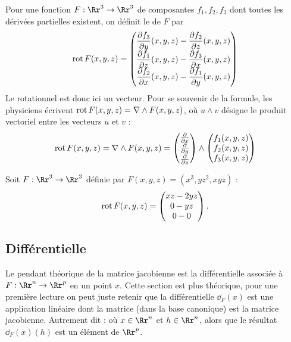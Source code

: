 \documentclass[12pt, class=report,crop=false]{standalone}
\begin{document}
\bigskip
\bigskip


Pour une fonction  $F : \Rr^3 \to \Rr^3$ de composantes $f_1,f_2,f_3$ dont toutes les dérivées partielles existent, on d\'efinit le  de $F$ par
$$\operatorname{rot} F (x,y,z)=
\begin{pmatrix}
    \dfrac{\partial f_3}{\partial y}(x,y,z)-\dfrac{\partial f_2}{\partial z}(x,y,z) \\
    \dfrac{\partial f_1}{\partial z}(x,y,z)-\dfrac{\partial f_3}{\partial x}(x,y,z) \\
    \dfrac{\partial f_2}{\partial x}(x,y,z)-\dfrac{\partial f_1}{\partial y}(x,y,z)
\end{pmatrix}
$$
Le rotationnel est donc ici un vecteur.
Pour se souvenir de la formule, les physiciens  écrivent $\operatorname{rot} F (x,y,z) =  \nabla \wedge F(x,y,z)$,
  où $u \wedge v$ désigne le produit vectoriel entre les vecteurs $u$ et $v$ :
$$\operatorname{rot} F (x,y,z)=  \nabla \wedge F(x,y,z)
= 
\begin{pmatrix}
\frac{\partial}{\partial x}\\
\frac{\partial}{\partial y}\\
\frac{\partial}{\partial z}\\
\end{pmatrix}
\wedge 
\begin{pmatrix}
f_1(x,y,z) \\
f_2(x,y,z) \\
f_3(x,y,z) \\
\end{pmatrix}
$$

\begin{exemple}
Soit $F : \Rr^3 \to \Rr^3$ définie par $F(x,y,z) = (x^3, yz^2, xyz)$ :
$$\operatorname{rot} F (x,y,z) = \begin{pmatrix} xz -2yz \\ 0 - yz \\ 0 - 0 \end{pmatrix}.$$
\end{exemple}



\subsection{Différentielle}


Le pendant théorique de la matrice jacobienne est la différentielle associée à $F : \Rr^n \to \Rr^p$ en un point $x$. Cette section est plus théorique, pour une première lecture on peut juste retenir que la différentielle $\dd_F(x)$ est une application linéaire dont la matrice (dans la base canonique) est la matrice jacobienne. Autrement dit :
où $x \in \Rr^n$ et $h\in \Rr^n$, alors que le résultat $\dd_F(x) (h)$ est un élément de $\Rr^p$.
\end{document}
